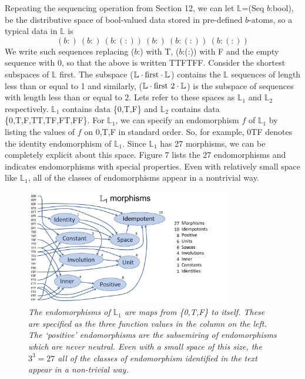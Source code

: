 \documentclass[11pt]{article}
\begin{document}
Repeating the sequencing operation from Section 12, we can let $\mathbb L$=(Seq $b$:bool), 
be the distributive space of bool-valued data stored in pre-defined $b$-atoms, so a typical data in $\mathbb L$ is 
\begin{equation}
(b:)\ (b:)\ (b:(:))\ (b:)\ (b:(:))\ (b:(:))
\end{equation}
We write such sequences replacing ($b$:) with T, ($b$:(:)) with F and the empty sequence with 0, so that the above is written TTFTFF.   
Consider the shortest subspaces of $\mathbb L$ first.  
The subspace (${\mathbb L}\cdot {\rm first}\cdot{\mathbb L}$) contains the $\mathbb L$ sequences of length less than or equal to 1 and similarly,  
(${\mathbb L}\cdot {\rm first\ 2}\cdot{\mathbb L}$) is the subspace of sequences with length less than or equal to 2.  Lets refer to these spaces as 
${\mathbb L}_1$ and ${\mathbb L}_2$ respectively.  
${\mathbb L}_1$ contains data \{0,T,F\} and ${\mathbb L}_2$ contains data \{0,T,F,TT,TF,FT,FF\}. 
For ${\mathbb L}_1$, we can specify an endomorphism $f$ of ${\mathbb L}_1$ by listing the values of $f$ on 0,T,F in standard order.  So, for example, 
0TF denotes the identity endomorphism of ${\mathbb L}_1$.  
Since ${\mathbb L}_1$ has 27 morphisms, we can be completely explicit about this space.  
Figure 7 lists the 27 endomorphisms and indicates endomorphisms with special properties. 
Even with relatively small space like ${\mathbb L}_1$, all of 
the classes of endomorphisms appear in a nontrivial way.

\begin{figure}[h]
\centering
\includegraphics[width=0.8\textwidth]{L1.pdf}
\caption{{\it The endomorphisms of ${\mathbb L}_1$ are maps from \{0,T,F\} to itself. These are specified as the three function 
values in the column on the left.  The `positive' endomorphisms are the subsemiring of endomorphisms which are never neutral.  Even with a small space of this size, the $3^3=27$ all of the classes of endomorphism identified in the text 
appear in a non-trivial way.}}
\end{figure}
\end{document}
